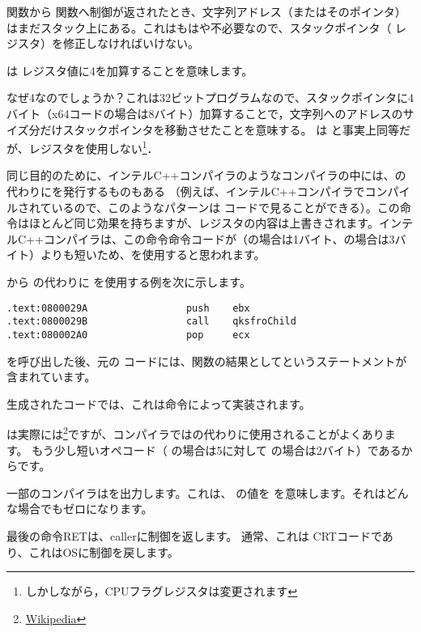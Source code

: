 \printf 関数から \main 関数へ制御が返されたとき、文字列アドレス（またはそのポインタ）はまだスタック上にある。これはもはや不必要なので、スタックポインタ（ \ESP レジスタ）を修正しなければいけない。

は \ESP レジスタ値に4を加算することを意味します。

なぜ4なのでしょうか？これは32ビットプログラムなので、スタックポインタに4バイト（x64コードの場合は8バイト）加算することで，文字列へのアドレスのサイズ分だけスタックポインタを移動させたことを意味する。
 は  と事実上同等だが、レジスタを使用しない\footnote{しかしながら，CPUフラグレジスタは変更されます}．

\myindex{\oracle}

同じ目的のために、インテルC++コンパイラのようなコンパイラの中には、\ADD の代わりにを発行するものもある
（例えば、インテルC++コンパイラでコンパイルされているので、このようなパターンは \oracle{} コードで見ることができる）。この命令はほとんど同じ効果を持ちますが、\ECX レジスタの内容は上書きされます。インテルC++コンパイラは、この命令命令コードが（の場合は1バイト、の場合は3バイト）よりも短いため、を使用すると思われます。

\oracle{} から \ADD の代わりに \POP を使用する例を次に示します。

\begin{lstlisting}[caption=\oracle 10.2 Linux (app.o file),style=customasmx86]
.text:0800029A                 push    ebx
.text:0800029B                 call    qksfroChild
.text:080002A0                 pop     ecx
\end{lstlisting}

\printf を呼び出した後、元の \CCpp コードには、\main 関数の結果としてというステートメントが含まれています。

生成されたコードでは、これは命令によって実装されます。


\XOR は実際には\footnote{\href{http://go.yurichev.com/17118}{Wikipedia}}ですが、コンパイラではの代わりに使用されることがよくあります。 もう少し短いオペコード（ \MOV の場合は5に対して \XOR の場合は2バイト）であるからです。

一部のコンパイラはを出力します。これは、 \EAX の値を \EAX {} を意味します。それはどんな場合でもゼロになります。

最後の命令RETは、\gls{caller}に制御を返します。 通常、これは \CCpp \ac{CRT}コードであり、これは\ac{OS}に制御を戻します。
